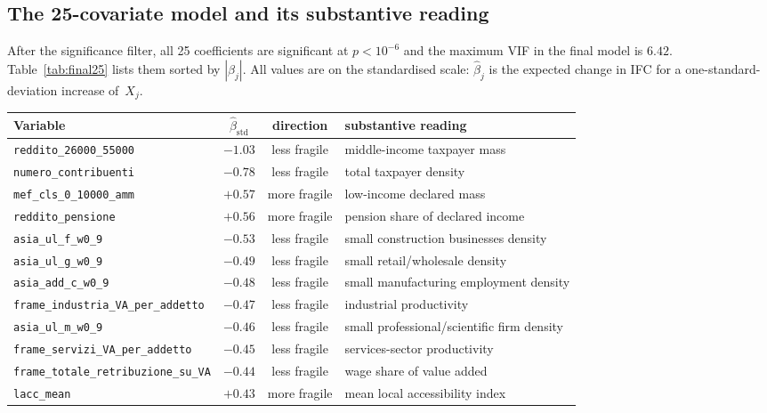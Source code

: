 \documentclass[11pt,a4paper]{article}
\begin{document}
\subsection{The 25-covariate model and its substantive reading}

After the significance filter, all 25 coefficients are significant
at $p < 10^{-6}$ and the maximum VIF in the final model is $6.42$.
Table~\ref{tab:final25} lists them sorted by $|\hat\beta_j|$. All
values are on the standardised scale: $\hat\beta_j$ is the expected
change in IFC for a one-standard-deviation increase of~$X_j$.

\begin{table}[h!]
  \centering
  \small
  \begin{tabular}{l c c l}
    \toprule
    Variable & $\hat\beta_{\text{std}}$ & direction & substantive reading \\
    \midrule
    \texttt{reddito\_26000\_55000}      & $-1.03$ & less fragile & middle-income taxpayer mass\\
    \texttt{numero\_contribuenti}       & $-0.78$ & less fragile & total taxpayer density\\
    \texttt{mef\_cls\_0\_10000\_amm}    & $+0.57$ & more fragile & low-income declared mass\\
    \texttt{reddito\_pensione}          & $+0.56$ & more fragile & pension share of declared income\\
    \texttt{asia\_ul\_f\_w0\_9}         & $-0.53$ & less fragile & small construction businesses density\\
    \texttt{asia\_ul\_g\_w0\_9}         & $-0.49$ & less fragile & small retail/wholesale density\\
    \texttt{asia\_add\_c\_w0\_9}        & $-0.48$ & less fragile & small manufacturing employment density\\
    \texttt{frame\_industria\_VA\_per\_addetto}   & $-0.47$ & less fragile & industrial productivity\\
    \texttt{asia\_ul\_m\_w0\_9}         & $-0.46$ & less fragile & small professional/scientific firm density\\
    \texttt{frame\_servizi\_VA\_per\_addetto}     & $-0.45$ & less fragile & services-sector productivity\\
    \texttt{frame\_totale\_retribuzione\_su\_VA}  & $-0.44$ & less fragile & wage share of value added\\
    \texttt{lacc\_mean}                 & $+0.43$ & more fragile & mean local accessibility index\\

\end{tabular}
\end{table}
\end{document}
